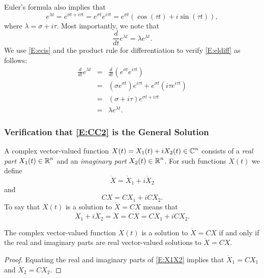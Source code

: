 \documentclass{ximera}
\begin{document}
Euler's formula also implies that
\begin{equation}  \label{E:ecis}
e^{\lambda t} = e^{\sigma t + i\tau t} = e^{\sigma t}e^{i\tau t} =
e^{\sigma t}(\cos(\tau t) + i\sin(\tau t)),
\end{equation}
where $\lambda = \sigma+i\tau$.  Most importantly, we note that
\begin{equation}  \label{E:eldiff}
\frac{d}{dt}e^{\lambda t} = \lambda e^{\lambda t}.
\end{equation}
We use \eqref{E:ecis} and the product rule for differentiation to verify
\eqref{E:eldiff} as follows:
\begin{eqnarray*}
\frac{d}{dt}e^{\lambda t} & =  &
\frac{d}{dt}\left(e^{\sigma t}e^{i\tau t}\right)\\
& = & \left(\sigma e^{\sigma t}\right)e^{i\tau t}
+ e^{\sigma t}\left(i\tau e^{i\tau t}\right)\\
& = & (\sigma+i\tau)e^{\sigma t + i\tau t} \\
& = & \lambda e^{\lambda t}.
\end{eqnarray*}

\subsubsection*{Verification that \protect\eqref{E:CC2} is the General Solution}

A complex vector-valued function $X(t)=X_1(t)+iX_2(t)\in\mbox{$\Bbb{C}$}^n$
 consists of
a {\em real part\/} $X_1(t)\in\mbox{$\Bbb{R}$}^n$ and an {\em imaginary part\/}
$X_2(t)\in\mbox{$\Bbb{R}$}^n$.  For such functions $X(t)$ we define
\[
\dot{X} = \dot{X}_1+i\dot{X}_2
\]
and
\[
CX = CX_1 + iCX_2.
\]
To say that $X(t)$ is a solution to $\dot{X}=CX$ means that
\begin{equation}  \label{E:X1X2}
\dot{X}_1+i\dot{X}_2 = \dot{X} = CX = CX_1 + iCX_2.
\end{equation}

\begin{lemma}  \label{L:RIsoln}
The complex vector-valued function $X(t)$ is a solution to $\dot{X}=CX$ if
and only if the real and imaginary parts are real vector-valued solutions
to $\dot{X}=CX$.
\end{lemma}

\begin{proof} 
Equating the real and imaginary parts of \eqref{E:X1X2} implies that
$\dot{X}_1 = CX_1$ and $\dot{X}_2 = CX_2$.
\end{proof}
\end{document}
